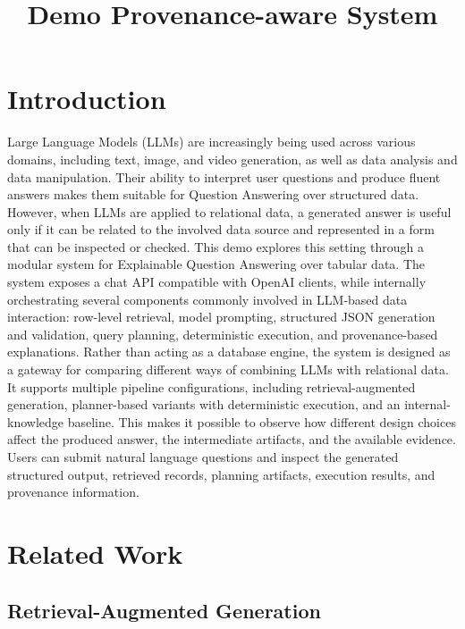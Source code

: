 \documentclass[11pt,a4paper]{article}
\title{Demo Provenance-aware System}
\author{}
\date{}
\begin{document}
\maketitle



\section{Introduction}
Large Language Models (LLMs) are increasingly being used across various domains, including
text, image, and video generation, as well as data analysis and data manipulation.
Their ability to interpret user questions and produce fluent answers makes them suitable for Question Answering over structured data. However, when LLMs are applied to relational data, a generated answer is useful only if it can be related to the involved data source and represented in a form that can be inspected or checked.
This demo explores this setting through a modular system for Explainable Question Answering over tabular data. 
The system exposes a chat API compatible with OpenAI clients, while internally orchestrating several components commonly involved in LLM-based data interaction: row-level retrieval, model prompting, structured JSON generation and validation, query planning, deterministic execution, and provenance-based explanations.
Rather than acting as a database engine, the system is designed as a gateway for comparing different ways of combining LLMs with relational data. It supports multiple pipeline configurations, including retrieval-augmented generation, planner-based variants with deterministic execution, and an internal-knowledge baseline. This makes it possible to observe how different design choices affect the produced answer, the intermediate artifacts, and the available evidence.
 Users can submit natural language questions and inspect the generated structured output, retrieved records, planning artifacts, execution results, and provenance information. 



\section{Related Work}

\subsection{Retrieval-Augmented Generation}
\end{document}
